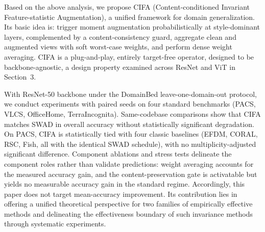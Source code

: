 \documentclass[electronics,article,submit,moreauthors]{Definitions/mdpi}
\newcommand{\add}[1]{\textcolor{addblue}{#1}}
\newcommand{\del}[1]{\textcolor{delred}{\st{#1}}}
\def\add#1{#1}%
\def\del#1{}%
\renewcommand{\add}[1]{#1}
\renewcommand{\del}[1]{}
\begin{document}
Based on the above analysis, we propose CIFA (Content-conditioned Invariant Feature-statistic Augmentation), a unified framework for domain generalization. Its basic idea is: trigger moment augmentation probabilistically at style-dominant layers, complemented by a content-consistency guard, aggregate clean and augmented views with soft worst-case weights, and perform dense weight averaging. CIFA is a plug-and-play, entirely target-free operator, \del{backbone-agnostic,}\add{designed to be backbone-agnostic, a design property examined across ResNet and ViT in Section~3.}

With ResNet-50 backbone under the DomainBed leave-one-domain-out protocol, we conduct experiments with paired seeds on four standard benchmarks (PACS, VLCS, OfficeHome, TerraIncognita). Same-codebase comparisons show that CIFA matches SWAD in overall accuracy without statistically significant degradation. On PACS, CIFA is statistically tied with four classic baselines (EFDM, CORAL, RSC, Fish, all with the identical SWAD schedule), with no multiplicity-adjusted significant difference. \del{Component ablations validate the framework's predictions about each component's role: weight averaging dominates overall accuracy, while the benefit of feature-moment mixing is constrained by content--style separability.}\add{Component ablations and stress tests delineate the component roles rather than validate predictions: weight averaging accounts for the measured accuracy gain, and the content-preservation gate is activatable but yields no measurable accuracy gain in the standard regime.} Accordingly, this paper does not target mean-accuracy improvement. Its contribution lies in offering a unified theoretical perspective for two families of empirically effective methods and delineating the \del{validity}\add{effectiveness} boundary of such invariance methods through systematic experiments.
\end{document}
